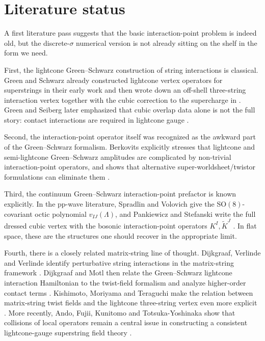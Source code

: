 \documentclass[11pt]{article}
\numberwithin{equation}{section}
\begin{document}
\section{Literature status}
A first literature pass suggests that the basic interaction-point problem is indeed old, but the discrete-$\sigma$ numerical version is not already sitting on the shelf in the form we need.

First, the lightcone Green--Schwarz construction of string interactions is classical. Green and Schwarz already constructed lightcone vertex operators for superstrings in their early work and then wrote down an off-shell three-string interaction vertex together with the cubic correction to the supercharge in \cite{GreenSchwarz1982Vertices,GreenSchwarz1983Interactions}. Green and Seiberg later emphasized that cubic overlap data alone is not the full story: contact interactions are required in lightcone gauge \cite{GreenSeiberg1988}.

Second, the interaction-point operator itself was recognized as the awkward part of the Green--Schwarz formalism. Berkovits explicitly stresses that lightcone and semi-lightcone Green--Schwarz amplitudes are complicated by non-trivial interaction-point operators, and shows that alternative super-worldsheet/twistor formulations can eliminate them \cite{Berkovits1992N20,Berkovits1993Twistor}.

Third, the continuum Green--Schwarz interaction-point prefactor is known explicitly. In the pp-wave literature, Spradlin and Volovich give the SO$(8)$-covariant octic polynomial $v_{IJ}(\Lambda)$, and Pankiewicz and Stefanski write the full dressed cubic vertex with the bosonic interaction-point operators $K^I,\widetilde K^J$ \cite{SpradlinVolovich2002,PankiewiczStefanski2002}. In flat space, these are the structures one should recover in the appropriate limit.

Fourth, there is a closely related matrix-string line of thought. Dijkgraaf, Verlinde and Verlinde identify perturbative string interactions in the matrix-string framework \cite{DVV1997Matrix}. Dijkgraaf and Motl then relate the Green--Schwarz lightcone interaction Hamiltonian to the twist-field formalism and analyze higher-order contact terms \cite{DijkgraafMotl2003}. Kishimoto, Moriyama and Teraguchi make the relation between matrix-string twist fields and the lightcone three-string vertex even more explicit \cite{Kishimoto2006}. More recently, Ando, Fujii, Kunitomo and Totsuka-Yoshinaka show that collisions of local operators remain a central issue in constructing a consistent lightcone-gauge superstring field theory \cite{Ando2025}.
\end{document}
